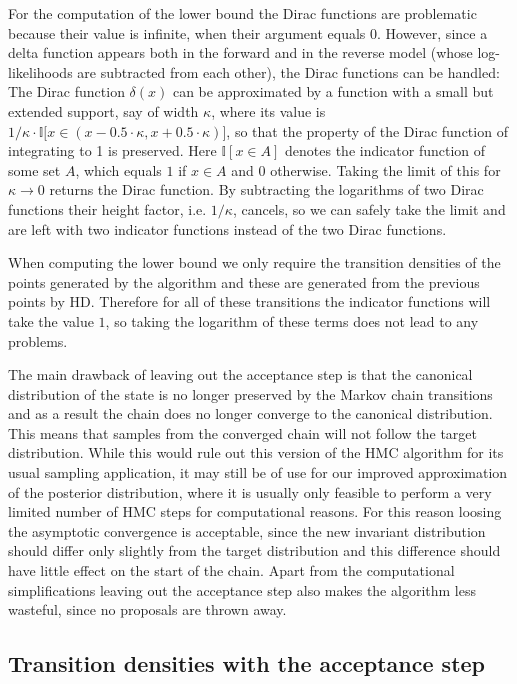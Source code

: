 For the computation of the lower bound the Dirac functions are problematic because their value is infinite, when their argument equals $0$. However, since a delta function appears both in the forward and in the reverse model (whose log-likelihoods are subtracted from each other), the Dirac functions can be handled: The Dirac function $\delta(x)$ can be approximated by a function with a small but extended support, say of width $\kappa$, where its value is $1/\kappa \cdot \mathbb{I}\big[x \in (x - 0.5 \cdot \kappa, x + 0.5 \cdot \kappa)\big]$, so that the property of the Dirac function of integrating to 1 is preserved. Here $\mathbb{I}[x \in A]$ denotes the indicator function of some set $A$, which equals $1$ if $x \in A$ and $0$ otherwise. Taking the limit of this for $\kappa \rightarrow 0$ returns the Dirac function. By subtracting the logarithms of two Dirac functions their height factor, i.e. $1/\kappa$, cancels, so we can safely take the limit and are left with two indicator functions instead of the two Dirac functions.

When computing the lower bound we only require the transition densities of the points generated by the algorithm and these are generated from the previous points by HD. Therefore for all of these transitions the indicator functions will take the value $1$, so taking the logarithm of these terms does not lead to any problems.

The main drawback of leaving out the acceptance step is that the canonical distribution of the state is no longer preserved by the Markov chain transitions and as a result the chain does no longer converge to the canonical distribution. This means that samples from the converged chain will not follow the target distribution. While this would rule out this version of the HMC algorithm for its usual sampling application, it may still be of use for our improved approximation of the posterior distribution, where it is usually only feasible to perform a very limited number of HMC steps for computational reasons. For this reason loosing the asymptotic convergence is acceptable, since the new invariant distribution should differ only slightly from the target distribution and this difference should have little effect on the start of the chain. Apart from the computational simplifications leaving out the acceptance step also makes the algorithm less wasteful, since no proposals are thrown away.

\subsection{Transition densities with the acceptance step}

